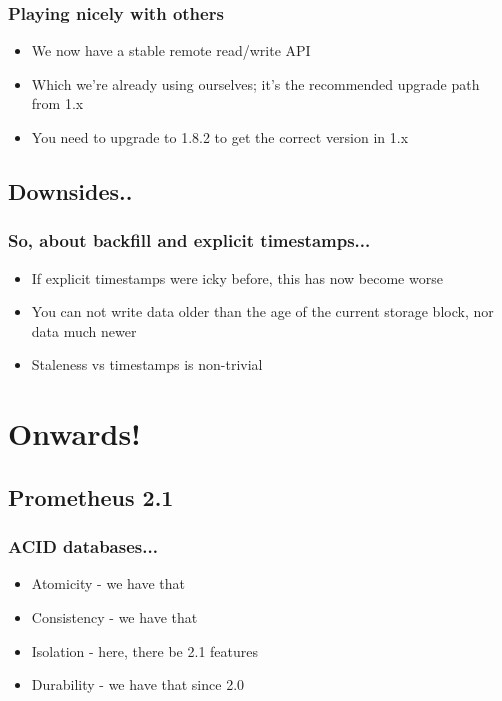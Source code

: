 \documentclass[t]{beamer}
\begin{document}
\begin{frame}
	\frametitle{Playing nicely with others}
	\begin{itemize}
		\item We now have a stable remote read/write API
		\item Which we're already using ourselves; it's the recommended upgrade path from 1.x
		\item You need to upgrade to 1.8.2 to get the correct version in 1.x
	\end{itemize}
\end{frame}


\subsection{Downsides..}

\begin{frame}
	\frametitle{So, about backfill and explicit timestamps...}
	\begin{itemize}
		\item If explicit timestamps were icky before, this has now become worse
		\item You can not write data older than the age of the current storage block, nor data much newer
		\item Staleness vs timestamps is non-trivial
	\end{itemize}
\end{frame}



\section{Onwards!}


\subsection{Prometheus 2.1}

\begin{frame}
	\frametitle{ACID databases...}
	\begin{itemize}
		\item Atomicity - we have that
		\item Consistency - we have that
		\item Isolation - here, there be 2.1 features
		\item Durability - we have that since 2.0
	\end{itemize}
\end{frame}
\end{document}
